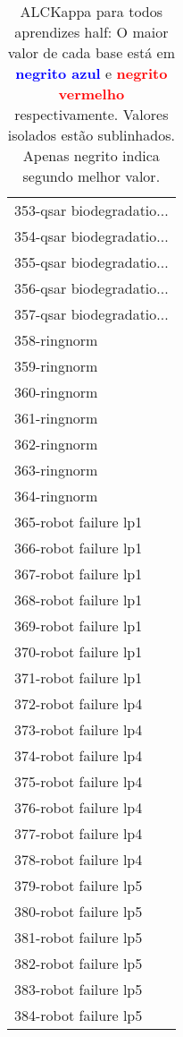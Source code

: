 \begin{table}[h]
\caption{ALCKappa para todos aprendizes half: O maior valor de cada base está em \textcolor{blue}{\textbf{negrito azul}} e \textcolor{red}{\textbf{negrito vermelho}} respectivamente. Valores isolados estão sublinhados. Apenas negrito indica segundo melhor valor.}
\begin{center}\begin{tabular}{l}
 & \\ \hline 353-qsar biodegradatio... &  \\
354-qsar biodegradatio... &  \\
355-qsar biodegradatio... &  \\
356-qsar biodegradatio... &  \\
357-qsar biodegradatio... &  \\
358-ringnorm &  \\
359-ringnorm &  \\ \hline
360-ringnorm &  \\
361-ringnorm &  \\
362-ringnorm &  \\
363-ringnorm &  \\
364-ringnorm &  \\
365-robot failure lp1 &  \\
366-robot failure lp1 &  \\ \hline
367-robot failure lp1 &  \\
368-robot failure lp1 &  \\
369-robot failure lp1 &  \\
370-robot failure lp1 &  \\
371-robot failure lp1 &  \\
372-robot failure lp4 &  \\
373-robot failure lp4 &  \\ \hline
374-robot failure lp4 &  \\
375-robot failure lp4 &  \\
376-robot failure lp4 &  \\
377-robot failure lp4 &  \\
378-robot failure lp4 &  \\
379-robot failure lp5 &  \\
380-robot failure lp5 &  \\ \hline
381-robot failure lp5 &  \\
382-robot failure lp5 &  \\
383-robot failure lp5 &  \\
384-robot failure lp5 &  \\\end{tabular}\label{stratsALCKappa11AllReduxHalfb}
\end{center}
\end{table}
